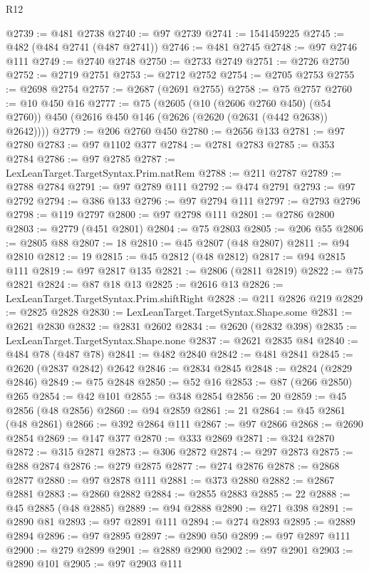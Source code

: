 \begin{lexlean}{R12}
\begin{coremodule}
{{{{{{{{{{{{{{{{{{{{{{{{{{{{{{{{{{{{{{{{{{{{{{{{{{{{{{{{{{{{{{{{{{{{{{{{{{{{{{{{{{@2739 := @481 @2738
@2740 := @97 @2739
@2741 := 1541459225
@2745 := @482 (@484 @2741 (@487 @2741))
@2746 := @481 @2745
@2748 := @97 @2746 @111
@2749 := @2740 @2748
@2750 := @2733 @2749
@2751 := @2726 @2750
@2752 := @2719 @2751
@2753 := @2712 @2752
@2754 := @2705 @2753
@2755 := @2698 @2754
@2757 := @2687 (@2691 @2755)
@2758 := @75 @2757
@2760 := @10 @450 @16
@2777 := @75
    (@2605
      (@10 (@2606 @2760 @450) (@54 @2760))
      @450
      (@2616 @450 @146 (@2626 (@2620 (@2631 (@442 @2638)) @2642))))
@2779 := @206 @2760 @450
@2780 := @2656 @133
@2781 := @97 @2780
@2783 := @97 @1102 @377
@2784 := @2781 @2783
@2785 := @353 @2784
@2786 := @97 @2785
@2787 := LexLeanTarget.TargetSyntax.Prim.natRem
@2788 := @211 @2787
@2789 := @2788 @2784
@2791 := @97 @2789 @111
@2792 := @474 @2791
@2793 := @97 @2792
@2794 := @386 @133
@2796 := @97 @2794 @111
@2797 := @2793 @2796
@2798 := @119 @2797
@2800 := @97 @2798 @111
@2801 := @2786 @2800
@2803 := @2779 (@451 @2801)
@2804 := @75 @2803
@2805 := @206 @55
@2806 := @2805 @88
@2807 := 18
@2810 := @45 @2807 (@48 @2807)
@2811 := @94 @2810
@2812 := 19
@2815 := @45 @2812 (@48 @2812)
@2817 := @94 @2815 @111
@2819 := @97 @2817 @135
@2821 := @2806 (@2811 @2819)
@2822 := @75 @2821
@2824 := @87 @18 @13
@2825 := @2616 @13
@2826 := LexLeanTarget.TargetSyntax.Prim.shiftRight
@2828 := @211 @2826 @219
@2829 := @2825 @2828
@2830 := LexLeanTarget.TargetSyntax.Shape.some
@2831 := @2621 @2830
@2832 := @2831 @2602
@2834 := @2620 (@2832 @398)
@2835 := LexLeanTarget.TargetSyntax.Shape.none
@2837 := @2621 @2835 @84
@2840 := @484 @78 (@487 @78)
@2841 := @482 @2840
@2842 := @481 @2841
@2845 := @2620 (@2837 @2842) @2642
@2846 := @2834 @2845
@2848 := @2824 (@2829 @2846)
@2849 := @75 @2848
@2850 := @52 @16
@2853 := @87 (@266 @2850) @265
@2854 := @42 @101
@2855 := @348 @2854
@2856 := 20
@2859 := @45 @2856 (@48 @2856)
@2860 := @94 @2859
@2861 := 21
@2864 := @45 @2861 (@48 @2861)
@2866 := @392 @2864 @111
@2867 := @97 @2866
@2868 := @2690 @2854
@2869 := @147 @377
@2870 := @333 @2869
@2871 := @324 @2870
@2872 := @315 @2871
@2873 := @306 @2872
@2874 := @297 @2873
@2875 := @288 @2874
@2876 := @279 @2875
@2877 := @274 @2876
@2878 := @2868 @2877
@2880 := @97 @2878 @111
@2881 := @373 @2880
@2882 := @2867 @2881
@2883 := @2860 @2882
@2884 := @2855 @2883
@2885 := 22
@2888 := @45 @2885 (@48 @2885)
@2889 := @94 @2888
@2890 := @271 @398
@2891 := @2890 @81
@2893 := @97 @2891 @111
@2894 := @274 @2893
@2895 := @2889 @2894
@2896 := @97 @2895
@2897 := @2890 @50
@2899 := @97 @2897 @111
@2900 := @279 @2899
@2901 := @2889 @2900
@2902 := @97 @2901
@2903 := @2890 @101
@2905 := @97 @2903 @111
}}}}}}}}}}}}}}}}}}}}}}}}}}}}}}}}}}}}}}}}}}}}}}}}}}}}}}}}}}}}}}}}}}}}}}}}}}}}}}}}}}
\end{coremodule}
\end{lexlean}
